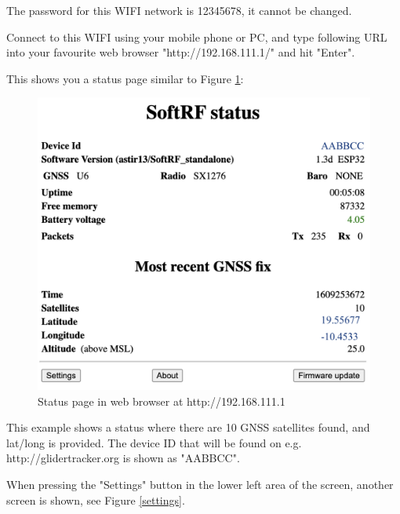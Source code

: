 \documentclass[11pt,a4paper]{article}
\begin{document}
The password for this WIFI network is 12345678, it cannot be changed.

Connect to this WIFI using your mobile phone or PC, and type following URL into your favourite web browser "http://192.168.111.1/" and hit "Enter".

This shows you a status page similar to Figure \ref{status}:

\begin{figure}[h]
\centering
\includegraphics[scale=.6]{status.png}
\caption{Status page in web browser at http://192.168.111.1}\label{status}
\end{figure}\FloatBarrier

This example shows a status where there are 10 GNSS satellites found, and lat/long is provided. The device ID that will be found on e.g. http://glidertracker.org is shown as "AABBCC".

When pressing the "Settings" button in the lower left area of the screen, another screen is shown, see Figure \ref{settings}.
\end{document}
